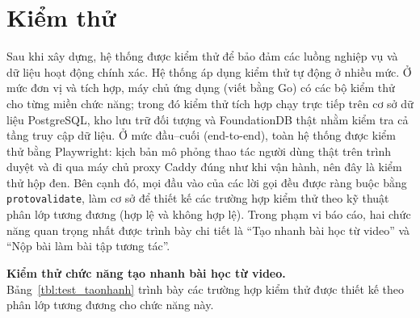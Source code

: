 \documentclass[../DoAn.tex]{subfiles}
\begin{document}
\section{Kiểm thử}
Sau khi xây dựng, hệ thống được kiểm thử để bảo đảm các luồng nghiệp vụ và dữ liệu hoạt động chính xác. Hệ thống áp dụng kiểm thử tự động ở nhiều mức. Ở mức đơn vị và tích hợp, máy chủ ứng dụng (viết bằng Go) có các bộ kiểm thử cho từng miền chức năng; trong đó kiểm thử tích hợp chạy trực tiếp trên cơ sở dữ liệu PostgreSQL, kho lưu trữ đối tượng và FoundationDB thật nhằm kiểm tra cả tầng truy cập dữ liệu. Ở mức đầu--cuối (end-to-end), toàn hệ thống được kiểm thử bằng Playwright: kịch bản mô phỏng thao tác người dùng thật trên trình duyệt và đi qua máy chủ proxy Caddy đúng như khi vận hành, nên đây là kiểm thử hộp đen. Bên cạnh đó, mọi đầu vào của các lời gọi đều được ràng buộc bằng \texttt{protovalidate}, làm cơ sở để thiết kế các trường hợp kiểm thử theo kỹ thuật phân lớp tương đương (hợp lệ và không hợp lệ). Trong phạm vi báo cáo, hai chức năng quan trọng nhất được trình bày chi tiết là ``Tạo nhanh bài học từ video'' và ``Nộp bài làm bài tập tương tác''.

\textbf{Kiểm thử chức năng tạo nhanh bài học từ video.} Bảng~\ref{tbl:test_taonhanh} trình bày các trường hợp kiểm thử được thiết kế theo phân lớp tương đương cho chức năng này.
\end{document}
